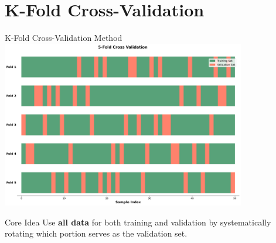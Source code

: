 \documentclass[8pt,aspectratio=1610]{beamer}
\begin{document}

\section{K-Fold Cross-Validation}

\begin{frame}{K-Fold Cross-Validation Method}
\centering
\includegraphics[width=0.8\textwidth]{../figures/kfold_validation.png}

\vspace{0.3cm}

\begin{alertblock}{Core Idea}
Use \textbf{all data} for both training and validation by systematically rotating which portion serves as the validation set.
\end{alertblock}
\end{frame}
\end{document}

